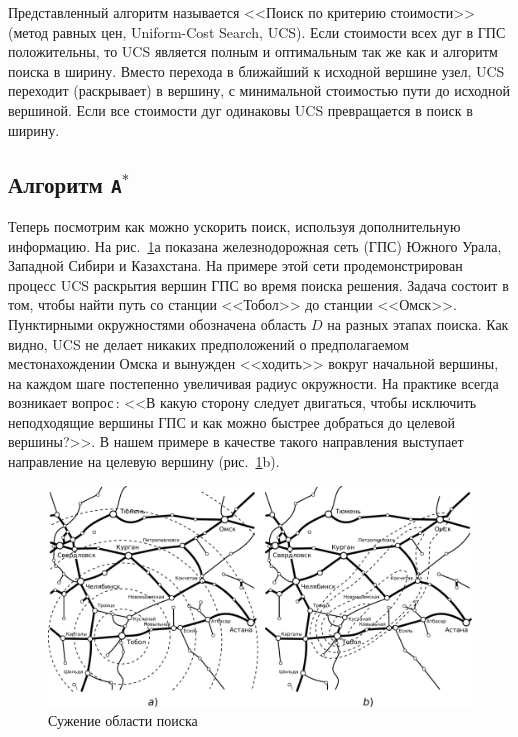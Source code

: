 \documentclass[a4paper,14pt, openany, twoside, draft]{extbook} %
\begin{document}
Представленный алгоритм называется <<Поиск по критерию стоимости>> (метод равных цен, \foreignlanguage{english}{Uniform-Cost Search}, UCS).  Если стоимости всех дуг в ГПС положительны, то UCS является полным и оптимальным так же как и алгоритм поиска в ширину.  Вместо перехода в ближайший к исходной вершине узел, UCS переходит (раскрывает) в вершину, с минимальной стоимостью пути до исходной вершиной.  Если все стоимости дуг одинаковы UCS превращается в поиск в ширину.

\subsection{Алгоритм \texttt{A}${}^\mathtt{*}$}

Теперь посмотрим как можно ускорить поиск, используя дополнительную информацию.  На рис.~\ref{fig:contraction}а показана железнодорожная сеть (ГПС) Южного Урала, Западной Сибири и Казахстана.  На примере этой сети продемонстрирован процесс UCS раскрытия вершин ГПС во время поиска решения.  Задача состоит в том, чтобы найти путь со станции <<Тобол>> до станции <<Омск>>.   Пунктирными окружностями обозначена область $D$ на разных этапах поиска.  Как видно, UCS не делает никаких предположений о предполагаемом местонахождении Омска и вынужден <<ходить>> вокруг начальной вершины, на каждом шаге постепенно увеличивая радиус окружности.  На практике всегда возникает вопрос\,: <<В какую сторону следует двигаться, чтобы исключить неподходящие вершины ГПС и как можно быстрее добраться до целевой вершины?>>.  В нашем примере в качестве такого направления выступает направление на целевую вершину (рис.~\ref{fig:contraction}b).
\begin{figure}[hbt]
  \centering
  \includegraphics[width=\columnwidth]{yuzd1.pdf}
  \caption{Сужение области поиска}\label{fig:contraction}
\end{figure}
\end{document}
